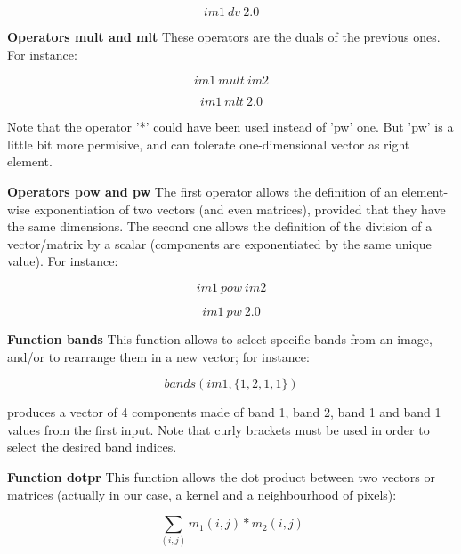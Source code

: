 \begin{equation}
	im1 ~ dv ~ 2.0
\end{equation}

\textbf{Operators mult and mlt} \newline
These operators are the duals of the previous ones. For instance:

\begin{equation}
	im1 ~  mult ~ im2
\end{equation}
 
\begin{equation}
	im1 ~  mlt ~ 2.0
\end{equation}

Note that the operator '*' could have been used instead of 'pw' one. But 'pw' is a little bit more permisive, and can tolerate one-dimensional vector as right element.

\textbf{Operators pow and pw} \newline
The first operator allows the definition of an element-wise exponentiation of two vectors (and even matrices), provided that they have the same dimensions.
The second one allows the definition of the division of a vector/matrix by a scalar (components are exponentiated by the same unique value). For instance: 

\begin{equation}
	im1 ~ pow ~ im2
\end{equation}

\begin{equation}
	im1 ~ pw ~ 2.0
\end{equation}

\textbf{Function bands} \newline
This function allows to select specific bands from an image, and/or to rearrange them in a new vector; for instance:

\begin{equation}
  bands(im1,\{1,2,1,1\})
\end{equation}

produces a vector of 4 components made of band 1, band 2, band 1 and band 1 values from the first input. Note that curly brackets must be used in order to select the desired band indices.

\textbf{Function dotpr } \newline
This function allows the dot product between two vectors or matrices (actually in our case, a kernel and a neighbourhood of pixels):

\begin{equation}
\sum_{(i,j)} m_1(i,j)*m_2(i,j)
\end{equation}

